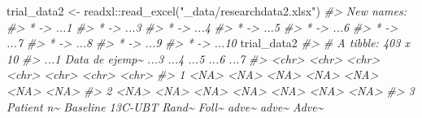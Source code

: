 \documentclass[
]{book}
\newenvironment{Shaded}{\begin{snugshade}}{\end{snugshade}}
\newcommand{\CommentTok}[1]{\textcolor[rgb]{0.56,0.35,0.01}{\textit{#1}}}
\newcommand{\FunctionTok}[1]{\textcolor[rgb]{0.00,0.00,0.00}{#1}}
\newcommand{\NormalTok}[1]{#1}
\newcommand{\OtherTok}[1]{\textcolor[rgb]{0.56,0.35,0.01}{#1}}
\newcommand{\SpecialCharTok}[1]{\textcolor[rgb]{0.00,0.00,0.00}{#1}}
\newcommand{\StringTok}[1]{\textcolor[rgb]{0.31,0.60,0.02}{#1}}
\begin{document}
\begin{Shaded}
\begin{Highlighting}[]
\NormalTok{trial\_data2 }\OtherTok{\textless{}{-}}\NormalTok{ readxl}\SpecialCharTok{::}\FunctionTok{read\_excel}\NormalTok{(}\StringTok{"\_data/researchdata2.xlsx"}\NormalTok{)}
\CommentTok{\#\textgreater{} New names:}
\CommentTok{\#\textgreater{} * \textasciigrave{}\textasciigrave{} {-}\textgreater{} \textasciigrave{}...1\textasciigrave{}}
\CommentTok{\#\textgreater{} * \textasciigrave{}\textasciigrave{} {-}\textgreater{} \textasciigrave{}...3\textasciigrave{}}
\CommentTok{\#\textgreater{} * \textasciigrave{}\textasciigrave{} {-}\textgreater{} \textasciigrave{}...4\textasciigrave{}}
\CommentTok{\#\textgreater{} * \textasciigrave{}\textasciigrave{} {-}\textgreater{} \textasciigrave{}...5\textasciigrave{}}
\CommentTok{\#\textgreater{} * \textasciigrave{}\textasciigrave{} {-}\textgreater{} \textasciigrave{}...6\textasciigrave{}}
\CommentTok{\#\textgreater{} * \textasciigrave{}\textasciigrave{} {-}\textgreater{} \textasciigrave{}...7\textasciigrave{}}
\CommentTok{\#\textgreater{} * \textasciigrave{}\textasciigrave{} {-}\textgreater{} \textasciigrave{}...8\textasciigrave{}}
\CommentTok{\#\textgreater{} * \textasciigrave{}\textasciigrave{} {-}\textgreater{} \textasciigrave{}...9\textasciigrave{}}
\CommentTok{\#\textgreater{} * \textasciigrave{}\textasciigrave{} {-}\textgreater{} \textasciigrave{}...10\textasciigrave{}}
\NormalTok{trial\_data2}
\CommentTok{\#\textgreater{} \# A tibble: 403 x 10}
\CommentTok{\#\textgreater{}    ...1       \textasciigrave{}Data de ejemp\textasciitilde{}\textasciigrave{} ...3  ...4  ...5  ...6  ...7 }
\CommentTok{\#\textgreater{}    \textless{}chr\textgreater{}      \textless{}chr\textgreater{}            \textless{}chr\textgreater{} \textless{}chr\textgreater{} \textless{}chr\textgreater{} \textless{}chr\textgreater{} \textless{}chr\textgreater{}}
\CommentTok{\#\textgreater{}  1 \textless{}NA\textgreater{}       \textless{}NA\textgreater{}             \textless{}NA\textgreater{}  \textless{}NA\textgreater{}  \textless{}NA\textgreater{}  \textless{}NA\textgreater{}  \textless{}NA\textgreater{} }
\CommentTok{\#\textgreater{}  2 \textless{}NA\textgreater{}       \textless{}NA\textgreater{}             \textless{}NA\textgreater{}  \textless{}NA\textgreater{}  \textless{}NA\textgreater{}  \textless{}NA\textgreater{}  \textless{}NA\textgreater{} }
\CommentTok{\#\textgreater{}  3 Patient n\textasciitilde{} Baseline 13C{-}UBT Rand\textasciitilde{} Foll\textasciitilde{} adve\textasciitilde{} adve\textasciitilde{} Adve\textasciitilde{}}

\end{Highlighting}
\end{Shaded}
\end{document}
